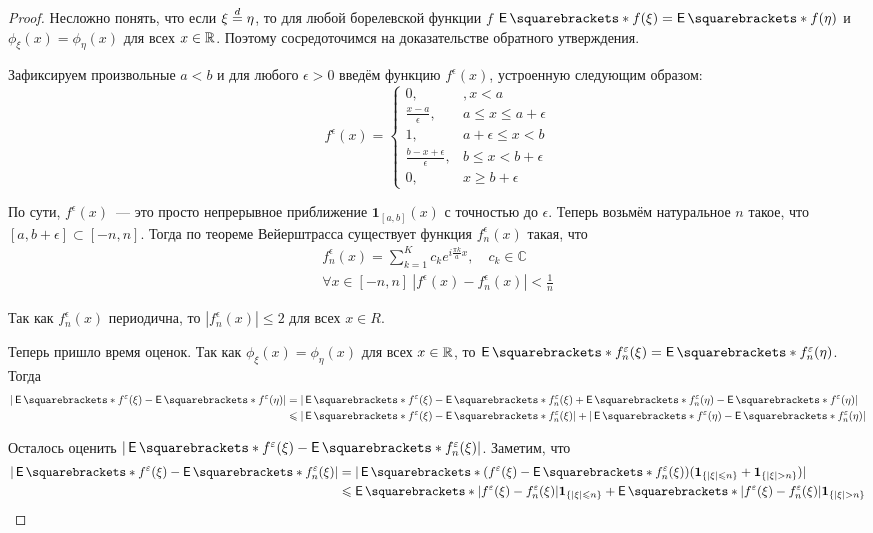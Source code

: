 \begin{proof}
	Несложно понять, что если \(\xi \overset{d}{=} \eta\), то для любой борелевской 
	функции \(f\) \(\E{f(\xi)} = \E{f(\eta)}\) и \(\phi_{\xi}(x) = 
	\phi_{\eta}(x)\) для всех \(x \in \mathbb{R}\). Поэтому сосредоточимся на 
	доказательстве обратного утверждения.
	
	Зафиксируем произвольные \(a < b\) и для любого \(\epsilon > 0\) введём 
	функцию \(f^{\epsilon}(x)\), устроенную следующим образом:
	\[
		f^{\epsilon}(x) = \begin{cases}
		0,&, x < a \\
		\frac{x - a}{\epsilon},& a \leq x \leq a + \epsilon \\
		1,& a + \epsilon \leq x < b \\
		\frac{b - x + \epsilon}{\epsilon},& b \leq x < b + \epsilon \\
		0, & x \geq b + \epsilon
		\end{cases}
	\]
	
	По сути, \(f^{\epsilon}(x)\)~--- это просто непрерывное приближение 
	\(\mathbf{1}_{[a, b]}(x)\) с точностью до \(\epsilon\). Теперь возьмём 
	натуральное \(n\) такое, что \([a, b + \epsilon] \subset [-n, n]\). Тогда 
	по теореме Вейерштрасса существует функция \(f_{n}^{\epsilon}(x)\) такая, 
	что
	\begin{gather*}
		f_{n}^{\epsilon}(x) = \sum_{k = 1}^{K} c_{k}e^{i\frac{\pi k}{a}x},\quad 
		c_{k} \in \mathbb{C} \\
		\forall x \in [-n, n]\ |f^{\epsilon}(x) - f_{n}^{\epsilon}(x)| < 
		\frac{1}{n}
	\end{gather*}

	Так как \(f_{n}^{\epsilon}(x)\) периодична, то \(|f_{n}^{\epsilon}(x)| \leq 
	2\) для всех \(x \in R\).
	
	Теперь пришло время оценок. Так как \(\phi_{\xi}(x) = \phi_{\eta}(x)\) для 
	всех \(x \in \mathbb{R}\), то \(\E{f_{n}^{\epsilon}(\xi)} = \E{ 
	f_{n}^{\epsilon}(\eta)}\). Тогда 
	\begin{align*}
		|\E{f^{\epsilon}(\xi)} - \E{f^{\epsilon}(\eta)}| &= 
		|\E{f^{\epsilon}(\xi)} - \E{f_{n}^{\epsilon}(\xi)} + \E{ 
		f_{n}^{\epsilon}(\eta)} - \E{f^{\epsilon}(\eta)}| \\
		&\leq |\E{f^{\epsilon}(\xi)} - \E{f_{n}^{\epsilon}(\xi)}| + 
		|\E{f^{\epsilon}(\eta)} - \E{ f_{n}^{\epsilon}(\eta)}|
	\end{align*}

	Осталось оценить \(|\E{f^{\epsilon}(\xi)} - \E{f_{n}^{\epsilon}(\xi)}|\). 	
	Заметим, что
	\begin{align*}
		|\E{f^{\epsilon}(\xi)} - \E{f_{n}^{\epsilon}(\xi)}| &= 
		|\E{(f^{\epsilon}(\xi)} - \E{f_{n}^{\epsilon}(\xi))(\mathbf{1}_{\{|\xi| 
		\leq n\}} + \mathbf{1}_{\{|\xi| > n\}})}|\\
		&\leq \E{|f^{\epsilon}(\xi) - f_{n}^{\epsilon}(\xi)| 
		\mathbf{1}_{\{|\xi| \leq n\}}} + \E{|f^{\epsilon}(\xi) - 
		f_{n}^{\epsilon}(\xi)| \mathbf{1}_{\{|\xi| > n\}}}
	\end{align*}


\end{proof}

